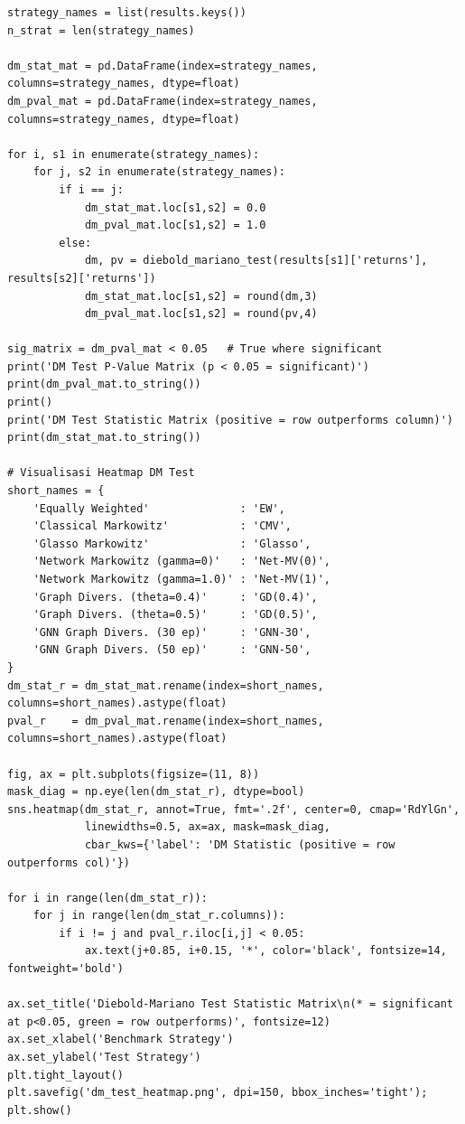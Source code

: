 \documentclass[12pt,a4paper]{article}
\begin{document}
\begin{lstlisting}[caption={Komputasi Matriks DM Test}]
strategy_names = list(results.keys())
n_strat = len(strategy_names)

dm_stat_mat = pd.DataFrame(index=strategy_names, columns=strategy_names, dtype=float)
dm_pval_mat = pd.DataFrame(index=strategy_names, columns=strategy_names, dtype=float)

for i, s1 in enumerate(strategy_names):
    for j, s2 in enumerate(strategy_names):
        if i == j:
            dm_stat_mat.loc[s1,s2] = 0.0
            dm_pval_mat.loc[s1,s2] = 1.0
        else:
            dm, pv = diebold_mariano_test(results[s1]['returns'], results[s2]['returns'])
            dm_stat_mat.loc[s1,s2] = round(dm,3)
            dm_pval_mat.loc[s1,s2] = round(pv,4)

sig_matrix = dm_pval_mat < 0.05   # True where significant
print('DM Test P-Value Matrix (p < 0.05 = significant)')
print(dm_pval_mat.to_string())
print()
print('DM Test Statistic Matrix (positive = row outperforms column)')
print(dm_stat_mat.to_string())

# Visualisasi Heatmap DM Test
short_names = {
    'Equally Weighted'              : 'EW',
    'Classical Markowitz'           : 'CMV',
    'Glasso Markowitz'              : 'Glasso',
    'Network Markowitz (gamma=0)'   : 'Net-MV(0)',
    'Network Markowitz (gamma=1.0)' : 'Net-MV(1)',
    'Graph Divers. (theta=0.4)'     : 'GD(0.4)',
    'Graph Divers. (theta=0.5)'     : 'GD(0.5)',
    'GNN Graph Divers. (30 ep)'     : 'GNN-30',
    'GNN Graph Divers. (50 ep)'     : 'GNN-50',
}
dm_stat_r = dm_stat_mat.rename(index=short_names, columns=short_names).astype(float)
pval_r    = dm_pval_mat.rename(index=short_names, columns=short_names).astype(float)

fig, ax = plt.subplots(figsize=(11, 8))
mask_diag = np.eye(len(dm_stat_r), dtype=bool)
sns.heatmap(dm_stat_r, annot=True, fmt='.2f', center=0, cmap='RdYlGn',
            linewidths=0.5, ax=ax, mask=mask_diag,
            cbar_kws={'label': 'DM Statistic (positive = row outperforms col)'})

for i in range(len(dm_stat_r)):
    for j in range(len(dm_stat_r.columns)):
        if i != j and pval_r.iloc[i,j] < 0.05:
            ax.text(j+0.85, i+0.15, '*', color='black', fontsize=14, fontweight='bold')

ax.set_title('Diebold-Mariano Test Statistic Matrix\n(* = significant at p<0.05, green = row outperforms)', fontsize=12)
ax.set_xlabel('Benchmark Strategy')
ax.set_ylabel('Test Strategy')
plt.tight_layout()
plt.savefig('dm_test_heatmap.png', dpi=150, bbox_inches='tight'); plt.show()

\end{lstlisting}
\end{document}
